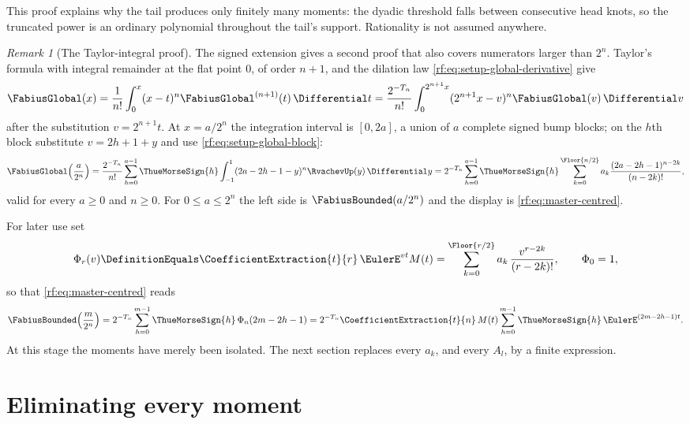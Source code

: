 \documentclass[11pt,oneside]{article}
\theoremstyle{plain}
\theoremstyle{definition}
\theoremstyle{remark}
\newtheorem{remark}[theorem]{Remark}
\newcommand{\Fb}{\FabiusBounded}            %
\newcommand{\Fg}{\FabiusGlobal}             %
\newcommand{\up}{\RvachevUp}                %
\newcommand{\tm}[1]{\ThueMorseSign{#1}}     %
\newcommand{\dd}{\Differential}
\newcommand{\coeff}[2]{\CoefficientExtraction{#1}{#2}}
\newcommand{\Tr}[1]{T_{#1}}                 %
\begin{document}
This proof explains why the tail produces only finitely many moments: the
dyadic threshold falls between consecutive head knots, so the truncated power
is an ordinary polynomial throughout the tail's support.  Rationality is
not assumed anywhere.

\begin{remark}[The Taylor-integral proof]
\label{rf:rmk:master-taylor}
The signed extension gives a second proof that also covers numerators
larger than $2^{n}$.  Taylor's formula with integral remainder at the flat
point $0$, of order $n+1$, and the dilation law
\cref{rf:eq:setup-global-derivative} give
\[
 \Fg(x)=\frac{1}{n!}\int_{0}^{x}(x-t)^{n}\Fg^{(n+1)}(t)\,\dd t
 =\frac{2^{-\Tr{n}}}{n!}\int_{0}^{2^{n+1}x}(2^{n+1}x-v)^{n}\Fg(v)\,\dd v
\]
after the substitution $v=2^{n+1}t$.  At $x=a/2^{n}$ the integration
interval is $[0,2a]$, a union of $a$ complete signed bump blocks; on the
$h$th block substitute $v=2h+1+y$ and use \cref{rf:eq:setup-global-block}:
\begin{equation}
 \Fg\!\left(\frac{a}{2^{n}}\right)
 =\frac{2^{-\Tr{n}}}{n!}\sum_{h=0}^{a-1}\tm{h}\int_{-1}^{1}(2a-2h-1-y)^{n}\up(y)\,\dd y
 =2^{-\Tr{n}}\sum_{h=0}^{a-1}\tm{h}\sum_{k=0}^{\Floor{n/2}}a_{k}\frac{(2a-2h-1)^{n-2k}}{(n-2k)!},
 \label{rf:eq:master-global}
\end{equation}
valid for every $a\ge0$ and $n\ge0$.  For $0\le a\le2^{n}$ the left side is
$\Fb(a/2^{n})$ and the display is \cref{rf:eq:master-centred}.
\end{remark}

For later use set
\begin{equation}
 \Phi_{r}(v)\DefinitionEquals\coeff{t}{r}\,\EulerE^{vt}M(t)
 =\sum_{k=0}^{\Floor{r/2}}a_{k}\,\frac{v^{r-2k}}{(r-2k)!},\qquad\Phi_{0}=1,
 \label{rf:eq:master-Phi}
\end{equation}
so that \cref{rf:eq:master-centred} reads
\begin{equation}
 \Fb\!\left(\frac{m}{2^{n}}\right)
 =2^{-\Tr{n}}\sum_{h=0}^{m-1}\tm{h}\,\Phi_{n}(2m-2h-1)
 =2^{-\Tr{n}}\coeff{t}{n}\,M(t)\sum_{h=0}^{m-1}\tm{h}\,\EulerE^{(2m-2h-1)t}.
 \label{rf:eq:master-egf}
\end{equation}
At this stage the moments have merely been isolated.  The next section
replaces every $a_{k}$, and every $A_{l}$, by a finite expression.

\section{Eliminating every moment}
\label{rf:sec:moments}
\end{document}
